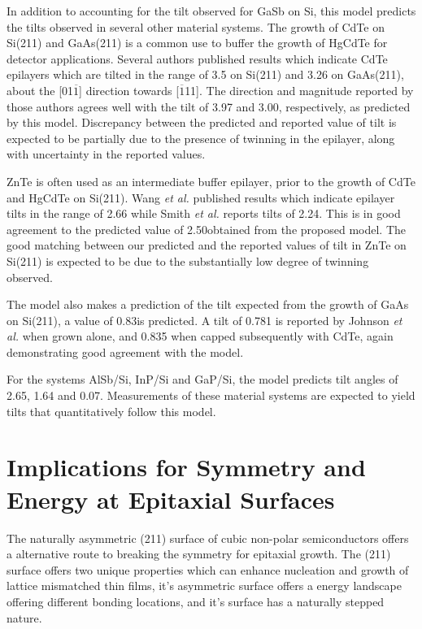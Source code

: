 In addition to accounting for the tilt observed for GaSb on Si, this model predicts the tilts observed in several other material systems. The growth of CdTe on Si(211) and GaAs(211) is a common use to buffer the growth of HgCdTe for detector applications. Several authors\cite{Triboulet2009,Yu1999,Lange1991} published results which indicate CdTe epilayers which are tilted in the range of 3.5\degree{} on Si(211)\cite{Zhao2011} and 3.26\degree{} on GaAs(211)\cite{Johnson2011}, about the [01$\overline{1}$] direction towards [$\overline{1}$11]. The direction and magnitude reported by those authors agrees well with the tilt of 3.97\degree{} and 3.00\degree, respectively, as predicted by this model. Discrepancy between the predicted and reported value of tilt is expected to be partially due to the presence of twinning in the epilayer, along with uncertainty in the reported values.

ZnTe is often used as an intermediate buffer epilayer, prior to the growth of CdTe and HgCdTe on Si(211).\cite{Zhao2011,Dhar1997a} Wang \textit{et al.}\cite{Wang2011a} published results which indicate epilayer tilts in the range of 2.66\degree{} while Smith \textit{et al.}\cite{smith2012_znte} reports tilts of 2.24\degree. This is in good agreement to the predicted value of 2.50\degree obtained from the proposed model. The good matching between our predicted and the reported values of tilt in ZnTe on Si(211) is expected to be due to the substantially low degree of twinning observed.

The model also makes a prediction of the tilt expected from the growth of GaAs on Si(211), a value of 0.83\degree is predicted. A tilt of 0.781\degree{} is reported by Johnson \textit{et al.}\cite{Johnson2011} when grown alone, and 0.835\degree{} when capped subsequently with CdTe, again demonstrating good agreement with the model.

For the systems AlSb/Si, InP/Si and GaP/Si, the model predicts tilt angles of 2.65\degree{}, 1.64\degree{} and 0.07\degree. Measurements of these material systems are expected to yield tilts that quantitatively follow this model.
\section{Implications for Symmetry and Energy at Epitaxial Surfaces}
The naturally asymmetric (211) surface of cubic non-polar semiconductors offers a 
alternative route to breaking the symmetry for epitaxial growth. The (211) surface offers 
two unique properties which can enhance nucleation and growth of lattice mismatched thin 
films, it's asymmetric surface offers a energy landscape offering different bonding 
locations, and it's surface has a naturally stepped nature.

